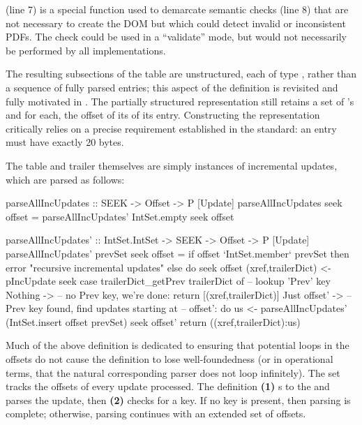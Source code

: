  (line 7) is a special function used to demarcate semantic checks (line 8) that are not necessary to
create the DOM but which could detect invalid or inconsistent PDFs.
%
The check could be used in a ``validate'' mode, but would not necessarily be performed by all implementations.

The resulting subsections of the \xref{} table are unstructured, each of type , rather than a sequence of fully parsed \xref{} entries;
%
this aspect of the definition is revisited and fully motivated in .
%
The partially structured representation still retains a set of \objid{}'s and for each, the offset of its of its \xref{} entry.
%
Constructing the representation critically relies on a precise requirement established in the standard: an \xref{} entry must have exactly 20 bytes.

The \xref{} table and trailer themselves are simply instances of incremental updates, which are parsed as follows:
\lstset{numbers=right}
\begin{code}
parseAllIncUpdates :: SEEK -> Offset -> P [Update]
parseAllIncUpdates seek offset =
  parseAllIncUpdates' IntSet.empty seek offset

parseAllIncUpdates' :: IntSet.IntSet -> SEEK -> Offset -> P [Update]
parseAllIncUpdates' prevSet seek offset =
    if offset `IntSet.member` prevSet then
      error "recursive incremental updates"
    else
      do
      seek offset
      (xref,trailerDict) <- pIncUpdate seek
      case trailerDict_getPrev trailerDict of   -- lookup 'Prev' key
        Nothing      -> -- no Prev key, we're done:
                        return [(xref,trailerDict)]
        Just offset' -> -- Prev key found, find updates starting at
                        -- offset':
                        do
                        us <- parseAllIncUpdates'
                                (IntSet.insert offset prevSet)
                                seek
                                offset'
                        return ((xref,trailerDict):us)
\end{code}
\lstset{numbers=none}
%
Much of the above definition is dedicated to ensuring that potential loops in the  offsets do not cause the definition to lose well-foundedness (or in operational terms, that the natural corresponding parser does not loop infinitely).
%
The set  tracks the offsets of every update processed.
%
The definition %
\textbf{(1)} s to the  and parses the update, then 
\textbf{(2)} checks for a  key.
%
If no key is present, then parsing is complete;
%
otherwise, parsing continues with an extended set of offsets.

